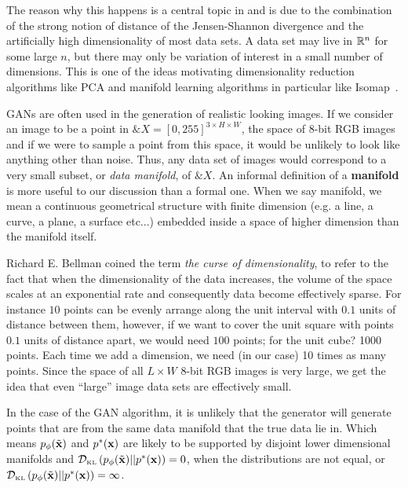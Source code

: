
The reason why this happens is a central topic in
\cite{ref:arjovsky-towards-2017} and is due to the combination of the
strong notion of distance of the Jensen-Shannon divergence and the
artificially high dimensionality of most data sets.  A data set may
live in $\mathbb{R}^n$ for some large $n$, but there may only be variation of
interest in a small number of dimensions. This is one of the ideas
motivating dimensionality reduction algorithms like PCA and manifold
learning algorithms in particular like
Isomap~\cite{ref:tenenbaum-2000}.

GANs are often used in the generation of realistic looking images. If
we consider an image to be a point in
$\&X = [0, 255]^{3 \times H \times W}$, the space of 8-bit RGB images
and if we were to sample a point from this space, it would be unlikely
to look like anything other than noise. Thus, any data set of images
would correspond to a very small subset, or \textit{data manifold}, of
$\&X$. An informal definition of a \textbf{manifold} is more useful to
our discussion than a formal one. When we say manifold, we mean a
continuous geometrical structure with finite dimension (e.g. a line, a
curve, a plane, a surface etc...) embedded inside a space of higher
dimension than the manifold itself.

Richard E. Bellman coined the term \textit{the curse of
  dimensionality}, to refer to the fact that when the dimensionality
of the data increases, the volume of the space scales at an
exponential rate and consequently data become effectively sparse. For
instance $10$ points can be evenly arrange along the unit interval
with $0.1$ units of distance between them, however, if we want to
cover the unit square with points $0.1$ units of distance apart, we
would need $100$ points; for the unit cube? 1000 points. Each time we
add a dimension, we need (in our case) 10 times as many points. Since
the space of all $L \times W$ 8-bit RGB images is very large, we get
the idea that even ``large'' image data sets are effectively small.

In the case of the GAN algorithm, it is unlikely that the generator
will generate points that are from the same data manifold that the
true data lie in. Which means $p_{\phi}(\tilde{\mathbf{x}})$ and $p^*(\mathbf{x})$ are likely to be
supported by disjoint lower dimensional manifolds and
$\mathcal{D}_{\text{\tiny KL}}\left( p_{\phi}(\tilde{\mathbf{x}}) \middle| \middle| p^*(\mathbf{x}) \right) = 0$, when the distributions are not equal, or
$\mathcal{D}_{\text{\tiny KL}}\left( p_{\phi}(\tilde{\mathbf{x}}) \middle| \middle| p^*(\mathbf{x}) \right) = \infty$.

